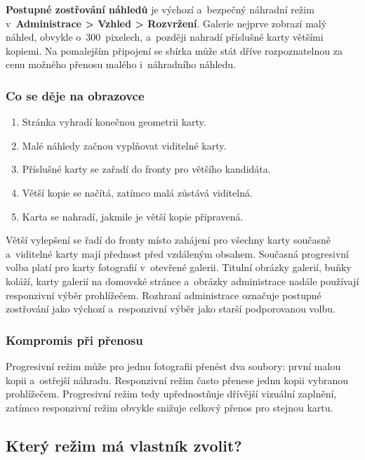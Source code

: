 \documentclass[11pt,a4paper]{article}
\newcommand{\ui}[1]{\textbf{#1}}
\begin{document}
\ui{Postupné zostřování náhledů} je výchozí a~bezpečný náhradní režim
v~\ui{Administrace > Vzhled > Rozvržení}. Galerie nejprve zobrazí malý náhled,
obvykle o~300~pixelech, a~později nahradí příslušné karty většími kopiemi. Na
pomalejším připojení se sbírka může stát dříve rozpoznatelnou za cenu možného
přenosu malého i~náhradního náhledu.

\subsubsection{Co se děje na obrazovce}

\begin{enumerate}
  \item Stránka vyhradí konečnou geometrii karty.
  \item Malé náhledy začnou vyplňovat viditelné karty.
  \item Příslušné karty se zařadí do fronty pro většího kandidáta.
  \item Větší kopie se načítá, zatímco malá zůstává viditelná.
  \item Karta se nahradí, jakmile je větší kopie připravená.
\end{enumerate}

Větší vylepšení se řadí do fronty místo zahájení pro všechny karty současně
a~viditelné karty mají přednost před vzdáleným obsahem. Současná progresivní
volba platí pro karty fotografií v~otevřené galerii. Titulní obrázky galerií,
buňky koláží, karty galerií na domovské stránce a~obrázky administrace nadále
používají responzivní výběr prohlížečem. Rozhraní administrace označuje postupné
zostřování jako výchozí a~responzivní výběr jako starší podporovanou volbu.

\subsubsection{Kompromis při přenosu}

Progresivní režim může pro jednu fotografii přenést dva soubory: první malou
kopii a~ostřejší náhradu. Responzivní režim často přenese jednu kopii vybranou
prohlížečem. Progresivní režim tedy upřednostňuje dřívější vizuální zaplnění,
zatímco responzivní režim obvykle snižuje celkový přenos pro stejnou kartu.

\subsection{Který režim má vlastník zvolit?}
\end{document}
